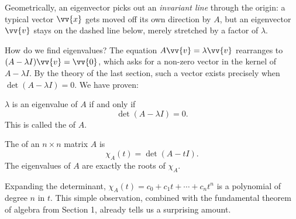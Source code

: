 Geometrically, an eigenvector picks out an \emph{invariant line} through the origin: a typical vector $\vv{x}$ gets moved off its own direction by $A$, but an eigenvector $\vv{v}$ stays on the dashed line below, merely stretched by a factor of $\lambda$.

\begin{center}
\end{center}

How do we find eigenvalues? The equation $A \vv{v} = \lambda \vv{v}$ rearranges to $(A - \lambda I)\vv{v} = \vv{0}$, which asks for a non-zero vector in the kernel of $A - \lambda I$. By the theory of the last section, such a vector exists precisely when $\det(A - \lambda I) = 0$. We have proven:

\begin{proposition}
	$\lambda$ is an eigenvalue of $A$ if and only if
	$$
	\det (A - \lambda I) = 0.
	$$
	This is called the  of $A$.
\end{proposition}

\begin{definition}
	The  of an $n \times n$ matrix $A$ is
	$$
	\chi_A(t) = \det(A - tI).
	$$
	The eigenvalues of $A$ are exactly the roots of $\chi_A$.
\end{definition}

Expanding the determinant, $\chi_A(t) = c_0 + c_1 t + \cdots + c_n t^n$ is a polynomial of degree $n$ in $t$. This simple observation, combined with the fundamental theorem of algebra from Section 1, already tells us a surprising amount.

